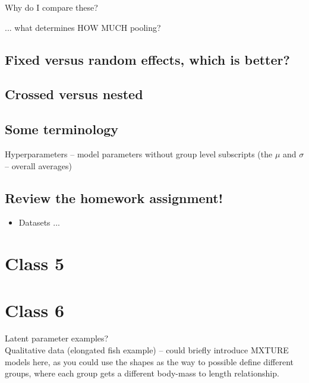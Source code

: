 \documentclass[11pt]{article}
\begin{document}
Why do I compare these? 

 ... what determines HOW MUCH pooling?

\subsection{Fixed versus random effects, which is better?}



\subsection{Crossed versus nested}

\subsection{Some terminology}
Hyperparameters -- model parameters without group level subscripts (the $\mu$ and $\sigma$ -- overall averages)



\subsection{Review the homework assignment!}
\begin{itemize}
\item Datasets ... 
\end{itemize}

\newpage
\section{Class 5} 




\newpage
\section{Class 6} 

Latent parameter examples?\\
Qualitative data (elongated fish example) -- could briefly introduce MXTURE models here, as you could use the shapes as the way to possible define different groups, where each group gets a different body-mass to length relationship. 
\end{document}
